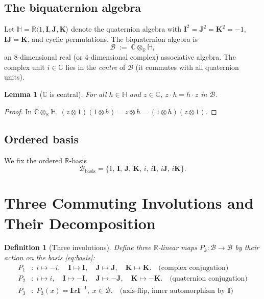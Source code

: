 \documentclass[12pt,a4paper]{article}
\newtheorem{lemma}[theorem]{Lemma}
\newtheorem{definition}[theorem]{Definition}
\theoremstyle{remark}
\newcommand{\B}{\mathcal{B}}          %
\newcommand{\C}{\mathbb{C}}
\newcommand{\R}{\mathbb{R}}
\newcommand{\H}{\mathbb{H}}
\begin{document}
\subsection{The biquaternion algebra}

Let $\H = \R\langle 1,\mathbf{I},\mathbf{J},\mathbf{K}\rangle$ denote the
quaternion algebra with $\mathbf{I}^2=\mathbf{J}^2=\mathbf{K}^2=-1$,
$\mathbf{I}\mathbf{J}=\mathbf{K}$, and cyclic permutations.  The biquaternion
algebra is
\[
  \B \;:=\; \C \otimes_\R \H,
\]
an $8$-dimensional real (or $4$-dimensional complex) associative algebra.
The complex unit $i\in\C$ lies in the \emph{centre} of $\B$ (it commutes with
all quaternion units).

\begin{lemma}[$\C$ is central]
  \label{lem:C_central}
  For all $h\in\H$ and $z\in\C$, $z\cdot h = h\cdot z$ in $\B$.
\end{lemma}
\begin{proof}
  In $\C\otimes_\R\H$, $(z\otimes 1)(1\otimes h) = z\otimes h
  = (1\otimes h)(z\otimes 1)$.
\end{proof}

\subsection{Ordered basis}

We fix the ordered $\R$-basis
\begin{equation}
  \label{eq:basis}
  \mathcal{B}_\mathrm{basis} = \{1,\,\mathbf{I},\,\mathbf{J},\,\mathbf{K},\,
    i,\,i\mathbf{I},\,i\mathbf{J},\,i\mathbf{K}\}.
\end{equation}

\section{Three Commuting Involutions and Their Decomposition}
\label{sec:involutions}

\begin{definition}[Three involutions]
  \label{def:involutions}
  Define three $\R$-linear maps $P_k:\B\to\B$ by their action on the basis
  \eqref{eq:basis}:
  \begin{align*}
    P_1 &:\; i\mapsto -i,\quad \mathbf{I}\mapsto\mathbf{I},\quad
      \mathbf{J}\mapsto\mathbf{J},\quad \mathbf{K}\mapsto\mathbf{K}.
      \quad\text{(complex conjugation)}\\
    P_2 &:\; i\mapsto i,\quad \mathbf{I}\mapsto-\mathbf{I},\quad
      \mathbf{J}\mapsto-\mathbf{J},\quad \mathbf{K}\mapsto-\mathbf{K}.
      \quad\text{(quaternion conjugation)}\\
    P_3 &:\; P_3(x) = \mathbf{I}x\mathbf{I}^{-1},\; x\in\B.
      \quad\text{(axis-flip, inner automorphism by }\mathbf{I})
  \end{align*}
\end{definition}
\end{document}
